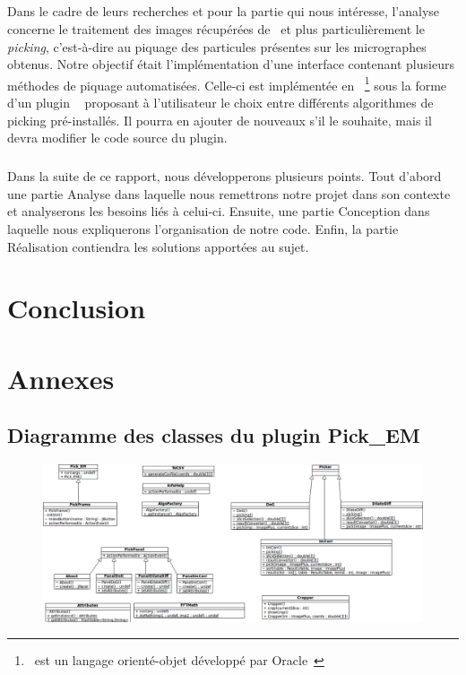 \documentclass[12pt,a4paper]{report}
\begin{document}
\paragraph*{}
Dans le cadre de leurs recherches et pour la partie qui nous intéresse, l'analyse concerne le traitement des images récupérées de \cme\ et plus particulièrement le \emph{picking}, c'est-à-dire au piquage des particules présentes sur les micrographes obtenus. %
Notre objectif était l'implémentation d'une interface contenant plusieurs méthodes de piquage automatisées.
Celle-ci est implémentée en \java ~\footnote{\java\ est un langage orienté-objet développé par Oracle~\cite{java:url}} sous la forme d'un plugin \imj ~\cite{imagej:url} proposant à l'utilisateur le choix entre différents algorithmes de picking pré-installés. Il pourra en ajouter de nouveaux s'il le souhaite, mais il devra modifier le code source du plugin. 

\paragraph*{}
Dans la suite de ce rapport, nous développerons plusieurs points. Tout d'abord une partie Analyse dans laquelle nous remettrons notre projet dans son contexte et analyserons les besoins liés à celui-ci. Ensuite, une partie Conception dans laquelle nous expliquerons l'organisation de notre code. Enfin, la partie Réalisation contiendra les solutions apportées au sujet.







\chapter*{Conclusion}





\appendix
\chapter{Annexes}


\newpage

\section{Diagramme des classes du plugin Pick\_EM}

\begin{figure}[!ht] 
\begin{center}
\includegraphics[width=1.4\textwidth, angle=90]{diagComplet.png}
\end{center}
\end{figure}
\end{document}
